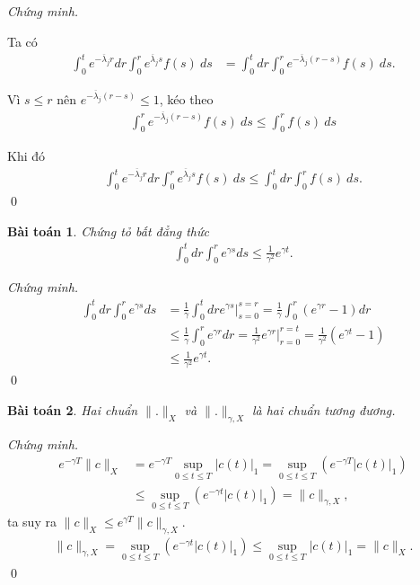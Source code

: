 \documentclass[12pt,a4paper]{article}
\newtheorem{theorem}{Bài toán}[section]
\theoremstyle{definition}
\begin{document}
\textit{Chứng minh.} 

Ta có
\begin{align*}
    \int_0^t e^{-\overline{\lambda}_j r} dr \int_0^r e^{\overline{\lambda}_j s} f(s)\:ds
    &= \int_0^t dr \int_0^r e^{-\overline{\lambda}_j (r-s)} f(s)\:ds.
\end{align*}

Vì $s \le r$ nên $e^{-\overline{\lambda}_j (r-s)} \le 1$, kéo theo
\begin{align*}
    \int_0^r e^{-\overline{\lambda}_j (r-s)} f(s)\:ds \le \int_0^r f(s)\:ds
\end{align*}

Khi đó
\begin{align*}
    \int_0^t e^{-\overline{\lambda}_j r} dr \int_0^r e^{\overline{\lambda}_j s} f(s)\:ds
    \le \int_0^t dr \int_0^r f(s)\:ds.
\end{align*} \qed

\begin{theorem}
    Chứng tỏ bất đẳng thức
    \begin{align*}
        \int_0^t dr \int_0^r e^{\gamma s} ds \le \frac{1}{\gamma^2} e^{\gamma t}.
    \end{align*}
\end{theorem}

\textit{Chứng minh.}
\begin{align*}
    \int_0^t dr \int_0^r e^{\gamma s} ds
    &= \frac{1}{\gamma} \int_0^t dr \left.e^{\gamma s}\right|_{s=0}^{s=r}
    = \frac{1}{\gamma} \int_0^r \left(e^{\gamma r} - 1\right)dr \\
    &\le \frac{1}{\gamma} \int_0^r e^{\gamma r} dr
    = \frac{1}{\gamma^2} \left.e^{\gamma r}\right|_{r=0}^{r=t}
    = \frac{1}{\gamma^2} \left(e^{\gamma t} - 1\right) \\
    &\le \frac{1}{\gamma^2} e^{\gamma t}.
\end{align*} \qed

\begin{theorem}
    Hai chuẩn $\|.\|_X$ và $\|.\|_{\gamma,X}$ là hai chuẩn tương đương.
\end{theorem}

\textit{Chứng minh.}
\begin{align*}
    e^{-\gamma T} \|c\|_X
    &= e^{-\gamma T} \sup_{0 \le t \le T} |c(t)|_1
    = \sup_{0 \le t \le T} \left(e^{-\gamma T} |c(t)|_1\right) \\
    &\le \sup_{0 \le t \le T} \left(e^{-\gamma t} |c(t)|_1\right)
    = \|c\|_{\gamma,X},
\end{align*}
ta suy ra $\|c\|_X \le e^{\gamma T} \|c\|_{\gamma,X}$.
\begin{align*}
    \|c\|_{\gamma,X}
    = \sup_{0 \le t \le T} \left(e^{-\gamma t} |c(t)|_1\right)
    \le \sup_{0 \le t \le T} |c(t)|_1
    = \|c\|_X.
\end{align*} \qed
\end{document}
